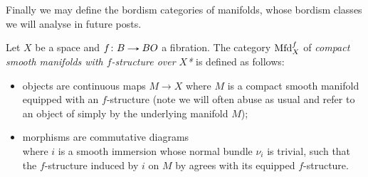 Finally we may define the bordism categories of manifolds, whose
bordism classes we will analyse in future posts.

\begin{definition}
  Let $X$ be a space and $f \c B \to BO$ a fibration. The category
  $\mathrm{Mfd}^f_X$ of \emph{compact smooth manifolds with $f$-structure
    over $X$*} is defined as follows:
  \begin{itemize}
  \item objects are continuous maps $M \to X$ where $M$ is a compact
    smooth manifold equipped with an $f$-structure (note we will often
    abuse as usual and refer to an object of simply by the underlying
    manifold $M$);
  \item morphisms are commutative diagrams
    \[
    \]
    where $i$ is a smooth immersion whose normal bundle $\nu_i$ is
    trivial, such that the $f$-structure induced by $i$ on $M$ by
     agrees with its equipped $f$-structure.
  \end{itemize}


\end{definition}
